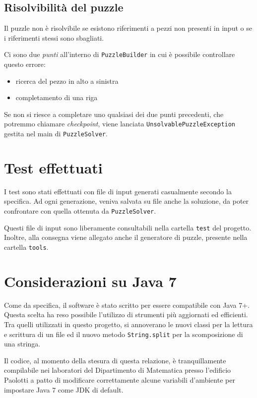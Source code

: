 \documentclass[a4paper, 12pt]{article}
\begin{document}
    \subsection{Risolvibilità del puzzle}

      Il puzzle non è risolvibile se esistono riferimenti a pezzi non presenti in input o se i riferimenti stessi sono sbagliati.

      Ci sono due \emph{punti} all'interno di \verb|PuzzleBuilder| in cui è possibile controllare questo errore:

      \begin{itemize}

        \item ricerca del pezzo in alto a sinistra
        \item completamento di una riga

      \end{itemize}

      Se non si riesce a completare uno qualsiasi dei due punti precedenti, che potremmo chiamare \emph{checkpoint}, viene lanciata \verb|UnsolvablePuzzleException| gestita nel main di \verb|PuzzleSolver|.

  \section{Test effettuati}

    I test sono stati effettuati con file di input generati casualmente secondo la specifica. Ad ogni generazione, veniva salvata su file anche la soluzione, da poter confrontare con quella ottenuta da \verb|PuzzleSolver|. 

    Questi file di input sono liberamente consultabili nella cartella \verb|test| del progetto. Inoltre, alla consegna viene allegato anche il generatore di puzzle, presente nella cartella \verb|tools|.

  \section{Considerazioni su Java 7}

    Come da specifica, il software è stato scritto per essere compatibile con Java 7+. Questa scelta ha reso possibile l'utilizzo di strumenti più aggiornati ed efficienti. Tra quelli utilizzati in questo progetto, si annoverano le nuovi classi per la lettura e scrittura di un file ed il nuovo metodo \verb|String.split| per la scomposizione di una stringa.

    Il codice, al momento della stesura di questa relazione, è tranquillamente compilabile nei laboratori del Dipartimento di Matematica presso l'edificio Paolotti a patto di modificare correttamente alcune variabili d'ambiente per impostare Java 7 come JDK di default.
\end{document}
